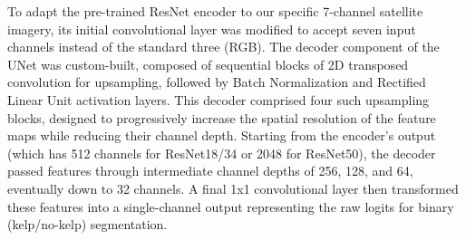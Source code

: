 \documentclass{article}
\begin{document}
To adapt the pre-trained ResNet encoder to our specific 7-channel satellite imagery, its initial convolutional layer was modified to accept seven input channels instead of the standard three (RGB). The decoder component of the UNet was custom-built, composed of sequential blocks of 2D transposed convolution for upsampling, followed by Batch Normalization and Rectified Linear Unit activation layers. This decoder comprised four such upsampling blocks, designed to progressively increase the spatial resolution of the feature maps while reducing their channel depth. Starting from the encoder's output (which has 512 channels for ResNet18/34 or 2048 for ResNet50), the decoder passed features through intermediate channel depths of 256, 128, and 64, eventually down to 32 channels. A final 1x1 convolutional layer then transformed these features into a single-channel output representing the raw logits for binary (kelp/no-kelp) segmentation.

\end{document}
